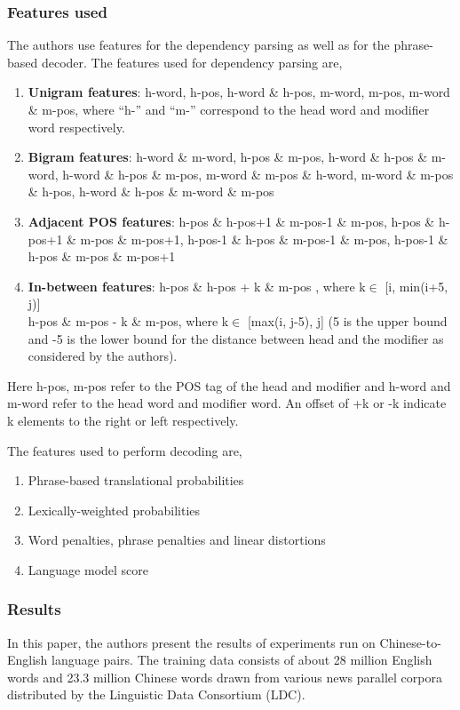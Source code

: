 \documentclass[10pt, letter]{article}
\begin{document}
\subsubsection*{Features used}
The authors use features for the dependency parsing as well as for the phrase-based decoder. The features used for dependency parsing are,
\begin{enumerate}
	\item \textbf{Unigram features}: h-word, h-pos, h-word \& h-pos, m-word, m-pos, m-word \& m-pos, where ``h-'' and ``m-'' correspond to the head word and modifier word respectively.
	\item \textbf{Bigram features}: h-word \& m-word, h-pos \& m-pos, h-word \& h-pos \& m-word, h-word \& h-pos \& m-pos, m-word \& m-pos \& h-word, m-word \& m-pos \& h-pos, h-word \& h-pos \& m-word \& m-pos
	\item \textbf{Adjacent POS features}: h-pos \& h-pos+1 \& m-pos-1 \& m-pos, h-pos \& h-pos+1 \& m-pos \& m-pos+1, h-pos-1 \& h-pos \& m-pos-1 \& m-pos, h-pos-1 \& h-pos \& m-pos \& m-pos+1
	\item \textbf{In-between features}: h-pos \& h-pos + k \& m-pos , where k$\in$ [i, min(i+5, j)] \\
	h-pos \& m-pos - k \& m-pos, where k$\in$ [max(i, j-5), j] (5 is the upper bound and -5 is the lower bound for the distance between head and the modifier as considered by the authors).
\end{enumerate}
Here h-pos, m-pos refer to the POS tag of the head and modifier and h-word and m-word refer to the head word and modifier word. An offset of +k or -k indicate k elements to the right or left respectively.

The features used to perform decoding are,
\begin{enumerate}
	\item Phrase-based translational probabilities
	\item Lexically-weighted probabilities
	\item Word penalties, phrase penalties and linear distortions
	\item Language model score
\end{enumerate}

\subsubsection*{Results}
In this paper, the authors present the results of experiments run on Chinese-to-English language pairs. The training data consists of
about 28 million English words and 23.3 million Chinese words drawn from various news parallel corpora distributed by the Linguistic Data Consortium (LDC).
\end{document}
